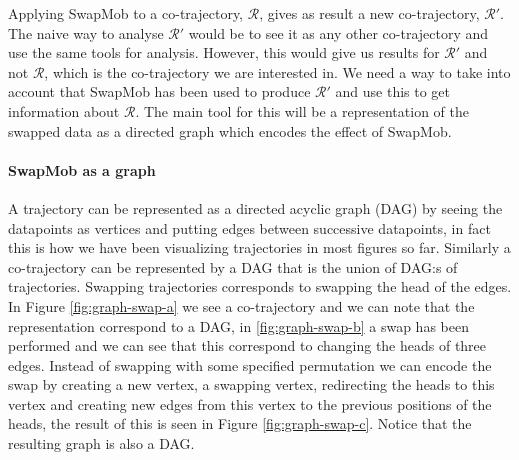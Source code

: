 \documentclass[12pt]{article}
\newcommand{\cotraj}{\mathcal{R}}
\theoremstyle{definition}
\begin{document}
Applying SwapMob to a co-trajectory, \(\cotraj\), gives as result a
new co-trajectory, \(\cotraj'\). The naive way to analyse \(\cotraj'\)
would be to see it as any other co-trajectory and use the same tools
for analysis. However, this would give us results for \(\cotraj'\) and
not \(\cotraj\), which is the co-trajectory we are interested in. We
need a way to take into account that SwapMob has been used to produce
\(\cotraj'\) and use this to get information about \(\cotraj\). The
main tool for this will be a representation of the swapped data as a
directed graph which encodes the effect of SwapMob.

\paragraph{SwapMob as a graph}
A trajectory can be represented as a directed acyclic graph (DAG) by
seeing the datapoints as vertices and putting edges between successive
datapoints, in fact this is how we have been visualizing trajectories
in most figures so far. Similarly a co-trajectory can be represented
by a DAG that is the union of DAG:s of trajectories. Swapping
trajectories corresponds to swapping the head of the edges. In Figure
\ref{fig:graph-swap-a} we see a co-trajectory and we can note that the
representation correspond to a DAG, in \ref{fig:graph-swap-b} a swap
has been performed and we can see that this correspond to changing the
heads of three edges. Instead of swapping with some specified
permutation we can encode the swap by creating a new vertex, a
swapping vertex, redirecting the heads to this vertex and creating new
edges from this vertex to the previous positions of the heads, the
result of this is seen in Figure \ref{fig:graph-swap-c}. Notice that
the resulting graph is also a DAG.
\end{document}
